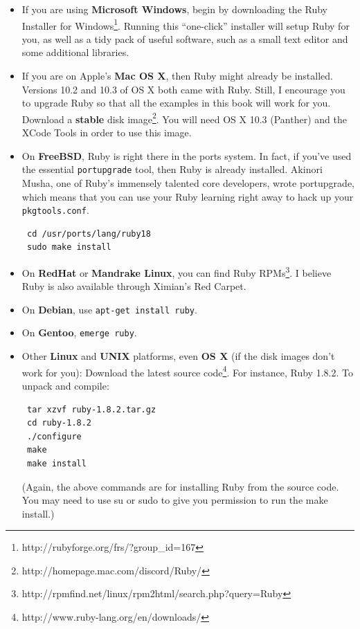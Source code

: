 \documentclass[10pt,twoside]{report}
\begin{document}
\begin{itemize}

\item 
If you are using \textbf{Microsoft Windows}, begin by downloading the
Ruby Installer for
Windows\footnote{http://rubyforge.org/frs/?group\_id=167}. Running
this ``one-click'' installer will setup Ruby for you, as well as a
tidy pack of useful software, such as a small text editor and some
additional libraries.

\item If you are on Apple's \textbf{Mac OS X}, then
Ruby might already be installed. Versions 10.2 and 10.3 of OS X both
came with Ruby. Still, I encourage you to upgrade Ruby so that all the
examples in this book will work for you. Download a \textbf{stable}
disk image\footnote{http://homepage.mac.com/discord/Ruby/}. You will
need OS X 10.3 (Panther) and the XCode Tools in order to use this
image.

\item On \textbf{FreeBSD}, Ruby is right there in the ports
system. In fact, if you've used the essential
\lstinline[breaklines=true]|portupgrade| tool, then Ruby is already
installed. Akinori Musha, one of Ruby's immensely talented core
developers, wrote portupgrade, which means that you can use your Ruby
learning right away to hack up your
\lstinline[breaklines=true]|pkgtools.conf|.

\begin{lstlisting}
 cd /usr/ports/lang/ruby18 
 sudo make install
\end{lstlisting}

\item On \textbf{RedHat} or \textbf{Mandrake Linux}, you can find Ruby
RPMs\footnote{http://rpmfind.net/linux/rpm2html/search.php?query=Ruby}. I
believe Ruby is also available through Ximian's Red Carpet.

\item On \textbf{Debian}, use 
\lstinline[breaklines=true]|apt-get install ruby|.

\item On \textbf{Gentoo}, \lstinline[breaklines=true]|emerge ruby|.

\item Other \textbf{Linux} and \textbf{UNIX}
platforms, even \textbf{OS X} (if the disk images don't work for you): Download
the latest source code\footnote{http://www.ruby-lang.org/en/downloads/}. 
For instance, Ruby 1.8.2. To unpack and compile:

\begin{lstlisting}
 tar xzvf ruby-1.8.2.tar.gz 
 cd ruby-1.8.2 
 ./configure 
 make
 make install
\end{lstlisting}

(Again, the above commands are for installing Ruby from the source
code. You may need to use su or sudo to give you permission to run the
make install.)

\end{itemize}
\end{document}
